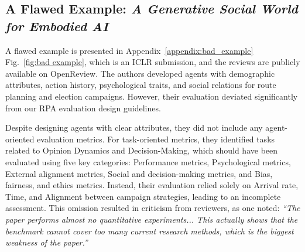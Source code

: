 \subsection{A Flawed Example: \textit{A Generative Social World for Embodied AI}}
\label{sec_bad_example}

A flawed example is presented in Appendix~\ref{appendix:bad_example} Fig.~\ref{fig:bad example}, which is an ICLR submission, and the reviews are publicly available on OpenReview.
The authors
developed agents with demographic attributes, action history, psychological traits, and social relations for route planning and election campaigns. However, their evaluation deviated significantly from our RPA evaluation design guidelines.

Despite designing agents with clear attributes, they did not include any agent-oriented evaluation metrics. For task-oriented metrics, they identified tasks related to Opinion Dynamics and Decision-Making, which should have been evaluated using five key categories: Performance metrics, Psychological metrics, External alignment metrics, Social and decision-making metrics, and Bias, fairness, and ethics metrics. Instead, their evaluation relied solely on Arrival rate, Time, and Alignment between campaign strategies, leading to an incomplete assessment. This omission resulted in criticism from reviewers, as one noted: \textit{``The paper performs almost no quantitative experiments... This actually shows that the benchmark cannot cover too many current research methods, which is the biggest weakness of the paper.''}